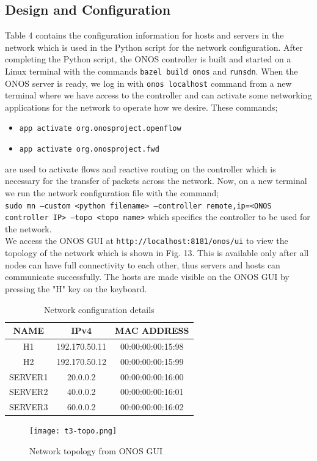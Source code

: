 \documentclass{article}
\begin{document}
\subsection{Design and Configuration}
Table 4 contains the configuration information for hosts and servers in the network which is used in the Python script for the network configuration. After completing the Python script, the ONOS controller is built and started on a Linux terminal with the commands \texttt{bazel build onos} and \texttt{runsdn}. When the ONOS server is ready, we log in with \texttt{onos localhost} command from a new terminal where we have access to the controller and can activate some networking applications for the network to operate how we desire. These commands;
	\begin{itemize}
		\centering
		\item \texttt{app activate org.onosproject.openflow}
		\item \texttt{app activate org.onosproject.fwd}
	\end{itemize}
are used to activate flows and reactive routing on the controller which is necessary for the transfer of packets across the network. Now, on a new terminal we run the network configuration file with the command; \\ \texttt{sudo mn --custom <python filename> --controller remote,ip=<ONOS controller IP> --topo <topo name>} which specifies the controller to be used for the network. \\ We access the ONOS GUI at \texttt{http://localhost:8181/onos/ui} to view the topology of the network which is shown in Fig. 13. This is available only after all nodes can have full connectivity to each other, thus servers and hosts can communicate successfully. The hosts are made visible on the ONOS GUI by pressing the "H" key on the keyboard.
    	\begin{table}[h]
        		\centering
        		\begin{tabular}{|c|c|c|}
            		\hline
            		NAME & IPv4 & MAC ADDRESS \\
            		\hline
            		H1 & 192.170.50.11 & 00:00:00:00:15:98 \\
           		H2 & 192.170.50.12 & 00:00:00:00:15:99 \\
            		SERVER1 & 20.0.0.2 & 00:00:00:00:16:00 \\
            		SERVER2 & 40.0.0.2 & 00:00:00:00:16:01 \\
            		SERVER3 & 60.0.0.2 & 00:00:00:00:16:02 \\
            		\hline
        		\end{tabular}
        		\caption{Network configuration details}
        		\label{tab:4}
    	\end{table}
    	\begin{figure}[h]
        		\centering
        		\texttt{[image: t3-topo.png]}
        		\caption{Network topology from ONOS GUI}
        		\label{fig:t3-1}
    	\end{figure}
\end{document}
